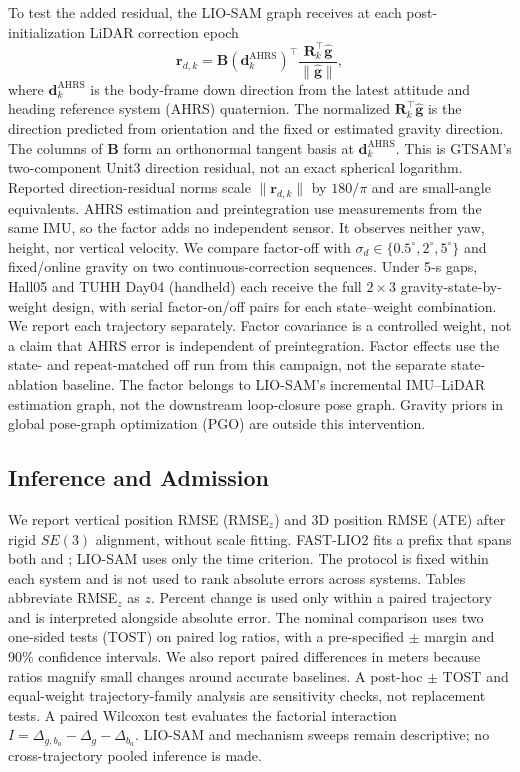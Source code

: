To test the added residual, the LIO-SAM graph receives at each
post-initialization LiDAR correction epoch
\begin{equation}
 \mathbf r_{d,k}=\mathbf B(\mathbf d_k^{\mathrm{AHRS}})^\top
 \frac{\mathbf R_k^\top\hat{\mathbf g}}{\|\hat{\mathbf g}\|},
 \label{eq:direction_factor}
\end{equation}
where $\mathbf d_k^{\mathrm{AHRS}}$ is the body-frame down direction from the
latest attitude and heading reference system (AHRS) quaternion.
The normalized $\mathbf R_k^\top\hat{\mathbf g}$ is the direction predicted
from orientation and the fixed or estimated gravity direction. The columns of $\mathbf B$ form an
orthonormal tangent basis at $\mathbf d_k^{\mathrm{AHRS}}$.
This is GTSAM's two-component Unit3 direction residual, not an exact
spherical logarithm. Reported direction-residual norms scale $\|\mathbf r_{d,k}\|$ by
$180/\pi$ and are small-angle equivalents.
AHRS estimation and preintegration use measurements from the same IMU, so the
factor adds no independent sensor. It observes neither yaw, height, nor vertical
velocity. We compare factor-off with
$\sigma_d\in\{0.5^\circ,2^\circ,5^\circ\}$ and fixed/online gravity on two
continuous-correction sequences. Under 5-s gaps, Hall05 and TUHH Day04
(handheld) each receive the full $2\times3$ gravity-state-by-weight design,
with \NumDirRepeatsPerCell{} serial factor-on/off pairs for each state--weight
combination. We report each
trajectory separately. Factor covariance is a controlled weight, not a claim
that AHRS error is independent of preintegration.
Factor effects use the state- and repeat-matched off run from this campaign,
not the separate state-ablation baseline.
The factor belongs to LIO-SAM's incremental IMU--LiDAR estimation graph, not
the downstream loop-closure pose graph. Gravity priors in global pose-graph
optimization (PGO) are outside this intervention.

\subsection{Inference and Admission}
We report vertical position RMSE (RMSE$_z$) and 3D position RMSE (ATE) after
rigid $SE(3)$ alignment, without scale fitting. FAST-LIO2 fits a prefix that
spans both \AlignSec{} and \AlignM{}; LIO-SAM uses only the time criterion. The
protocol is fixed within each system and is not used to rank absolute errors
across systems. Tables abbreviate RMSE$_z$ as $z$. Percent change is used only
within a paired trajectory and is interpreted alongside absolute error. The
nominal \methodG{} comparison uses two one-sided tests (TOST) on paired log
ratios, with a pre-specified $\pm$\EquivMargin{} margin and 90\% confidence
intervals. We also report
paired differences in meters because ratios magnify small changes around
accurate baselines. A post-hoc $\pm$\StrictEquivMargin{} TOST and equal-weight
trajectory-family analysis are sensitivity checks, not replacement tests. A
paired Wilcoxon test evaluates
the factorial interaction
$I=\Delta_{g,b_a}-\Delta_g-\Delta_{b_a}$. LIO-SAM and mechanism sweeps remain
descriptive; no cross-trajectory pooled inference is made.

